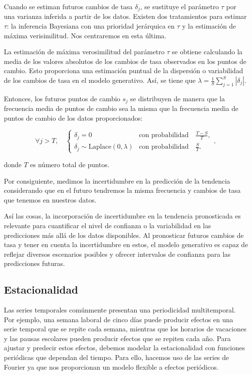 \documentclass[12pt,twoside]{article}
\begin{document}
Cuando se estiman futuros cambios de tasa $\delta_j$, se sustituye el parámetro $\tau$ por una varianza inferida a partir de los datos. Existen dos tratamientos para estimar $\tau$: la inferencia Bayesiana con una prioridad jerárquica en $\tau$ y la estimación de máxima verisimilitud. Nos centraremos en esta última.

La estimación de máxima verosimilitud del parámetro $\tau$ se obtiene calculando la media de los valores absolutos de los cambios de tasa observados en los puntos de cambio. Esto proporciona una estimación puntual de la dispersión o variabilidad de los cambios de tasa en el modelo generativo. Así, se tiene que $\lambda = \frac{1}{S} \sum_{j=1}^{S} |\delta_j|
$. 

Entonces, los futuros puntos de cambio $s_j$ se distribuyen de manera que la frecuencia media de puntos de cambio sea la misma que la frecuencia media de puntos de cambio de los datos proporcionados:

\begin{equation}
\forall j > T, \quad 
\begin{cases} 
\delta_j = 0 & \text{con probabilidad} \quad \frac{T-S}{T}, \\
\delta_j \sim\text{Laplace}(0, \lambda) & \text{con probabilidad} \quad \frac{S}{T}.
\end{cases},
\end{equation}

donde $T$ es número total de puntos.

Por consiguiente, medimos la incertidumbre en la predicción de la tendencia considerando que en el futuro tendremos la misma frecuencia y cambios de tasa que tenemos en nuestros datos.

Así las cosas, la incorporación de incertidumbre en la tendencia pronosticada es relevante para cuantificar el nivel de confianza o la variabilidad en las predicciones más allá de los datos disponibles. Al pronosticar futuros cambios de tasa y tener en cuenta la incertidumbre en estos, el modelo generativo es capaz de reflejar diversos escenarios posibles y ofrecer intervalos de confianza para las predicciones futuras.

\subsection{Estacionalidad}\label{sec:5}

Las series temporales comúnmente presentan una periodicidad multitemporal. Por ejemplo, una semana laboral de cinco días puede producir efectos en una serie temporal que se repite cada semana, mientras que los horarios de vacaciones y las pausas escolares pueden producir efectos que se repiten cada año. Para ajustar y predecir estos efectos, debemos modelar la estacionalidad con funciones periódicas que dependan del tiempo. Para ello, hacemos uso de las series de Fourier ya que nos proporcionan un modelo flexible a efectos periódicos. 
\end{document}

